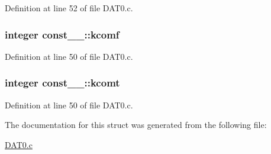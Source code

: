 Definition at line 52 of file D\+A\+T0.\+c.

\subsubsection[{\texorpdfstring{kcomf}{kcomf}}]{\setlength{\rightskip}{0pt plus 5cm}integer const\+\_\+\_\+\+::kcomf}\hypertarget{structconst__1___aa9c884ca4361b4189dfa11704145fac2}{}\label{structconst__1___aa9c884ca4361b4189dfa11704145fac2}


Definition at line 50 of file D\+A\+T0.\+c.

\subsubsection[{\texorpdfstring{kcomt}{kcomt}}]{\setlength{\rightskip}{0pt plus 5cm}integer const\+\_\+\_\+\+::kcomt}\hypertarget{structconst__1___a3b1014e7a63e0bfc2611e1822cc48d5b}{}\label{structconst__1___a3b1014e7a63e0bfc2611e1822cc48d5b}


Definition at line 50 of file D\+A\+T0.\+c.



The documentation for this struct was generated from the following file\+:\begin{DoxyCompactItemize}
\item 
\hyperlink{DAT0_8c}{D\+A\+T0.\+c}\end{DoxyCompactItemize}
